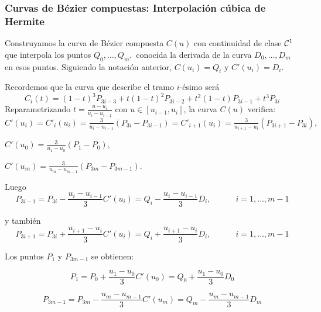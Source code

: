 \documentclass[twoside]{report}
\begin{document}
\subsubsection{Curvas de B\'{e}zier compuestas: Interpolaci\'{o}n c\'{u}bica de Hermite}

Construyamos la curva de B\'{e}zier compuesta $C(u)$ con continuidad de clase ${\cal C}^1$ que interpola los puntos
$Q_0,\ldots,Q_m,$ conocida la derivada de la curva $D_0,\ldots,D_m$ en esos puntos. Siguiendo la notaci\'{o}n anterior, $C(u_i)=Q_i$ y $C'(u_i)=D_i$.

\vspace{0.2cm}

Recordemos que la curva que describe el tramo $i$-\'{e}simo ser\'{a}
$$C_i(t)=(1-t)^3P_{3i-3}+t(1-t)^2P_{3i-2}+t^2(1-t)P_{3i-1}+t^3P_{3i}$$
Reparametrizando $t=\frac{u-u_i}{u_i-u_{i-1}}$ con $u\in [u_{i-1},u_i]$, la curva $C(u)$ verifica: $C'(u_i)=C'_{i}(u_i)=\frac{3}{u_i-u_{i-1}}(P_{3i}-P_{3i-1})=C'_{i+1}(u_i)=\frac{3}{u_{i+1}-u_{i}}(P_{3i+1}-P_{3i}),$

\vspace{0.2cm}

$C'(u_0)=\frac{3}{u_1-u_0}(P_1-P_0),$

\vspace{0.2cm}
$C'(u_m)=\frac{3}{u_m-u_{m-1}}(P_{3m}-P_{3m-1})$.

\vspace{0.3cm}

Luego
$$P_{3i-1}=P_{3i}-\frac{u_i-u_{i-1}}{3} C'(u_i)=Q_i-\frac{u_i-u_{i-1}}{3} D_i, \quad \quad \quad i=1,\ldots,m-1$$

y tambi\'{e}n
$$P_{3i+1}=P_{3i}+\frac{u_{i+1}-u_{i}}{3} C'(u_i)=Q_i+\frac{u_{i+1}-u_{i}}{3} D_i, \quad \quad \quad i=1,\ldots,m-1$$

Los puntos $P_1$ y $P_{3m-1}$ se obtienen:

$$P_1=P_0+\frac{u_1-u_{0}}{3} C'(u_0)=Q_0+\frac{u_1-u_{0}}{3} D_0$$

$$P_{3m-1}=P_{3m}-\frac{u_m-u_{m-1}}{3} C'(u_m)=Q_m-\frac{u_m-u_{m-1}}{3} D_m$$

\vspace{0.3cm}
\end{document}
